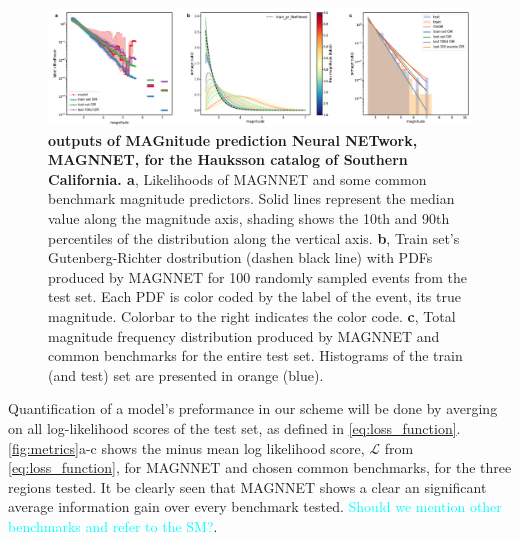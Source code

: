 \documentclass[pdflatex]{sn-jnl}
\newcommand{\neri}[1]{{\textcolor{cyan}{#1}}}
\begin{document}
\begin{figure}[h!]
    \centering
    \includegraphics[width=1\textwidth]{figures/raw_results_hauksson.pdf}
    \caption{
        \textbf{outputs of MAGnitude prediction Neural NETwork, MAGNNET, for the Hauksson catalog of Southern California. a}, Likelihoods of MAGNNET and some common benchmark magnitude predictors. Solid lines represent the median value along the magnitude axis, shading shows the 10th and 90th percentiles of the distribution along the vertical axis. \textbf{b}, Train set's Gutenberg-Richter dostribution (dashen black line) with PDFs produced by MAGNNET for 100 randomly sampled events from the test set. Each PDF is color coded by the label of the event, its true magnitude. Colorbar to the right indicates the color code. \textbf{c}, Total magnitude frequency distribution produced by MAGNNET and common benchmarks for the entire test set. Histograms of the train (and test) set are presented in orange (blue).
    }
    \label{fig:model_output}
\end{figure}


Quantification of a model's preformance in our scheme will be done by averging on all log-likelihood scores of the test set, as defined in \ref{eq:loss_function}. \ref{fig:metrics}a-c shows the minus mean log likelihood score, $\mathcal{L}$ from \ref{eq:loss_function}, for MAGNNET and chosen common benchmarks, for the three regions tested. It be clearly seen that MAGNNET shows a clear an significant average information gain over every benchmark tested. \neri{Should we mention other benchmarks and refer to the SM?}. 
\end{document}
